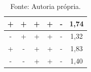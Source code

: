 \begin{table}[H]
\begin{tabular}{|c|c|c|c|c|c|}
  +              & +               & +                & +                 & -                  & 1,74           \\ \hline
  \rowcolor[HTML]{EFEFEF} 
  -              & +               & +                & +                 & -                  & 1,32           \\ \hline
  +              & -               & +                & +                 & -                  & 1,83           \\ \hline
  \rowcolor[HTML]{EFEFEF} 
  -              & -               & +                & +                 & -                  & 1,40           \\ \hline
  \end{tabular}
  \label{tab:dados_experimento}
  \caption*{Fonte: Autoria própria.}
\end{table}